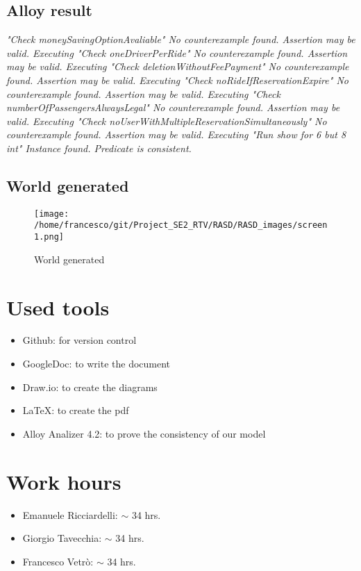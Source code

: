 \documentclass[10pt, a4paper,titlepage]{article}
\begin{document}
\subsection{Alloy result}
\textit{
"Check moneySavingOptionAvaliable"
No counterexample found. Assertion may be valid.
\newline
\newline
Executing "Check oneDriverPerRide"
No counterexample found. Assertion may be valid.
\newline
\newline
Executing "Check deletionWithoutFeePayment"
No counterexample found. Assertion may be valid.
\newline
\newline
Executing "Check noRideIfReservationExpire"
No counterexample found. Assertion may be valid.
\newline
\newline
Executing "Check numberOfPassengersAlwaysLegal"
No counterexample found. Assertion may be valid.
\newline
\newline
Executing "Check noUserWithMultipleReservationSimultaneously"
No counterexample found. Assertion may be valid.
\newline
\newline
Executing "Run show for 6 but 8 int"
Instance found. Predicate is consistent.
}
\clearpage
\subsection{World generated}
\begin{figure}[!b]
\texttt{[image: /home/francesco/git/Project\_SE2\_RTV/RASD/RASD\_images/screen1.png]}
\caption{World generated}
\label{fig:World generated}
\end{figure}
\clearpage
{}
\section*{Used tools}
\begin{itemize}
\item Github: for version control
\item GoogleDoc: to write the document
\item Draw.io: to create the diagrams
\item \LaTeX: to create the pdf
\item Alloy Analizer 4.2: to prove the consistency of our model 
\end{itemize}
\section*{Work hours} 
\begin{itemize}
\item Emanuele Ricciardelli: $\sim$ 34 hrs.
\item Giorgio Tavecchia: $\sim$ 34 hrs.
\item Francesco Vetrò: $\sim$ 34 hrs.
\end{itemize}
\end{document}
